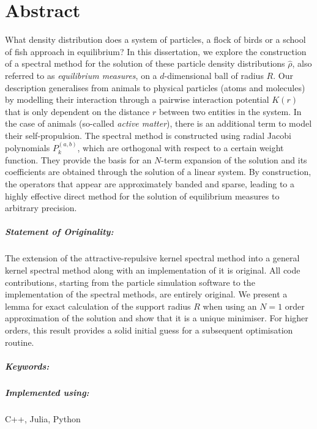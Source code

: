 \chapter*{Abstract}
\label{chap:abstract}
What density distribution does a system of particles, a flock of birds or a school of fish approach in equilibrium?
In this dissertation, we explore the construction of a spectral method for the solution of these particle density distributions $\hat{\rho}$, also referred to as \textit{equilibrium measures}, on a $d$-dimensional ball of radius $R$.
Our description generalises from animals to physical particles (atoms and molecules) by modelling their interaction through a pairwise interaction potential $K(r)$ that is only dependent on the distance $r$ between two entities in the system.
In the case of animals (so-called \textit{active matter}), there is an additional term to model their self-propulsion.
The spectral method is constructed using radial Jacobi polynomials $P_k^{(a,b)}$, which are orthogonal with respect to a certain weight function.
They provide the basis for an $N$-term expansion of the solution and its coefficients are obtained through the solution of a linear system.
By construction, the operators that appear are approximately banded and sparse, leading to a highly effective direct method for the solution of equilibrium measures to arbitrary precision.

\paragraph{Statement of Originality:}
The extension of the attractive-repulsive kernel spectral method into a general kernel spectral method along with an implementation of it is original.
All code contributions, starting from the particle simulation software to the implementation of the spectral methods, are entirely original.
We present a lemma for exact calculation of the support radius $R$ when using an $N = 1$ order approximation of the solution and show that it is a unique minimiser.
For higher orders, this result provides a solid initial guess for a subsequent optimisation routine.

\paragraph{Keywords:}
\thesiskeywords

\paragraph{Implemented using:}
C++, Julia, Python
